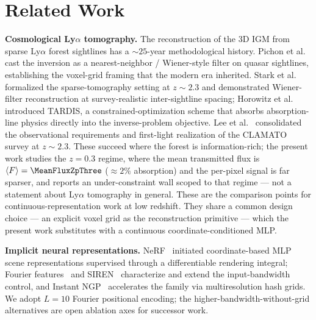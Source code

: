 \section{Related Work} %
\label{sec:related}

\textbf{Cosmological Ly$\alpha$ tomography.} The reconstruction of the 3D IGM from sparse Ly$\alpha$ forest sightlines has a $\sim\!25$-year methodological history. Pichon et al.~\cite{pichon2001tomography} cast the inversion as a nearest-neighbor / Wiener-style filter on quasar sightlines, establishing the voxel-grid framing that the modern era inherited. Stark et al.~\cite{stark2015tomography} formalized the sparse-tomography setting at $z \sim 2.3$ and demonstrated Wiener-filter reconstruction at survey-realistic inter-sightline spacing; Horowitz et al.~\cite{horowitz2019tardis} introduced TARDIS, a constrained-optimization scheme that absorbs absorption-line physics directly into the inverse-problem objective. Lee et al.~\cite{lee2015, lee2018clamato} consolidated the observational requirements and first-light realization of the CLAMATO survey at $z\sim 2.3$. These succeed where the forest is information-rich; the present work studies the $z = 0.3$ regime, where the mean transmitted flux is $\langle F\rangle = \MeanFluxZpThree$ ($\approx 2\%$ absorption) and the per-pixel signal is far sparser, and reports an under-constraint wall scoped to that regime --- not a statement about Ly$\alpha$ tomography in general. These are the comparison points for continuous-representation work at low redshift. They share a common design choice --- an explicit voxel grid as the reconstruction primitive --- which the present work substitutes with a continuous coordinate-conditioned MLP.

\textbf{Implicit neural representations.} NeRF~\cite{mildenhall2020nerf} initiated coordinate-based MLP scene representations supervised through a differentiable rendering integral; Fourier features~\cite{tancik2020fourier} and SIREN~\cite{sitzmann2020siren} characterize and extend the input-bandwidth control, and Instant NGP~\cite{muller2022instant} accelerates the family via multiresolution hash grids. We adopt $L=10$ Fourier positional encoding; the higher-bandwidth-without-grid alternatives are open ablation axes for successor work.

